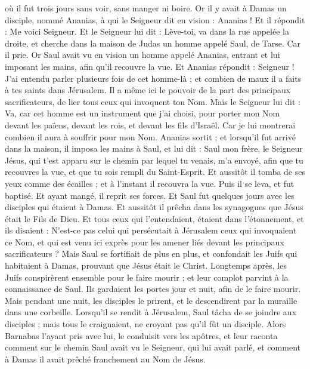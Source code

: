 \begin{multicols}{2}
où il fut trois jours sans voir, sans manger ni boire.
Or il y avait à Damas un disciple, nommé Ananias, à qui le Seigneur dit en vision : Ananias ! Et il répondit : Me voici Seigneur.
Et le Seigneur lui dit : Lève-toi, va dans la rue appelée la droite, et cherche dans la maison de Judas un homme appelé Saul, de Tarse.
Car il prie. Or Saul avait vu en vision un homme appelé Ananias, entrant et lui imposant les mains, afin qu'il recouvre la vue.
Et Ananias répondit : Seigneur ! J'ai entendu parler plusieurs fois de cet homme-là ; et combien de maux il a faits à tes saints dans Jérusalem.
Il a même ici le pouvoir de la part des principaux sacrificateurs, de lier tous ceux qui invoquent ton Nom.
Mais le Seigneur lui dit : Va, car cet homme est un instrument que j'ai choisi, pour porter mon Nom devant les païens, devant les rois, et devant les fils d'Israël.
Car je lui montrerai combien il aura à souffrir pour mon Nom.
Ananias sortit ; et lorsqu’il fut arrivé dans la maison, il imposa les mains à Saul, et lui dit : Saul mon frère, le Seigneur Jésus, qui t'est apparu sur le chemin par lequel tu venais, m'a envoyé, afin que tu recouvres la vue, et que tu sois rempli du Saint-Esprit.
Et aussitôt il tomba de ses yeux comme des écailles ; et à l'instant il recouvra la vue. Puis il se leva, et fut baptisé.
Et ayant mangé, il reprit ses forces. Et Saul fut quelques jours avec les disciples qui étaient à Damas.
Et aussitôt il prêcha dans les synagogues que Jésus était le Fils de Dieu.
Et tous ceux qui l'entendaient, étaient dans l’étonnement, et ils disaient : N'est-ce pas celui qui persécutait à Jérusalem ceux qui invoquaient ce Nom, et qui est venu ici exprès pour les amener liés devant les principaux sacrificateurs ?
Mais Saul se fortifiait de plus en plus, et confondait les Juifs qui habitaient à Damas, prouvant que Jésus était le Christ.
Longtemps après, les Juifs conspirèrent ensemble pour le faire mourir ;
et leur complot parvint à la connaissance de Saul. Ils gardaient les portes jour et nuit, afin de le faire mourir.
Mais pendant une nuit, les disciples le prirent, et le descendirent par la muraille dans une corbeille.
Lorsqu’il se rendit à Jérusalem, Saul tâcha de se joindre aux disciples ; mais tous le craignaient, ne croyant pas qu'il fût un disciple.
Alors Barnabas l’ayant pris avec lui, le conduisit vers les apôtres, et leur raconta comment sur le chemin Saul avait vu le Seigneur, qui lui avait parlé, et comment à Damas il avait prêché franchement au Nom de Jésus.

\end{multicols}
